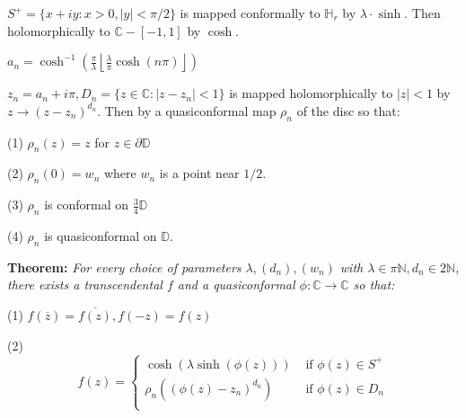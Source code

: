 \documentclass{beamer}
\begin{document}
\begin{frame} 

{\tiny $S^+ = \{ x + iy : x > 0, |y| < \pi/2 \}$ is mapped conformally to $\mathbb{H}_r$ by $\lambda\cdot\sinh$. Then holomorphically to $\mathbb{C} - [-1,1]$ by $\cosh$.

\vspace{1.25mm}

$a_n = \cosh^{-1}\left( \frac{\pi}{\lambda} \left \lfloor{ \frac{\lambda}{\pi} \cosh(n\pi) }\right \rfloor \right)$

\vspace{1.25mm}

$z_n = a_n + i\pi, D_n = \{ z \in \mathbb{C} : \left| z - z_n \right| < 1\} $ is mapped holomorphically to $|z|<1$ by $z\rightarrow (z - z_n)^{d_n}$. Then by a quasiconformal map $\rho_n$ of the disc so that: 

\hspace{5mm} (1) $\rho_n(z)=z$ for $z\in\partial\mathbb{D}$

\hspace{5mm} (2) $\rho_n(0)=w_n$ where $w_n$ is a point near $1/2$.

\hspace{5mm} (3) $\rho_n$ is conformal on $\frac{3}{4}\mathbb{D}$

\hspace{5mm} (4) $\rho_n$ is quasiconformal on $\mathbb{D}$.  

}

\vspace{5mm}

{\bf Theorem:}  {\it For every choice of parameters $\lambda, (d_n), (w_n)$ with $\lambda \in \pi\mathbb{N}, d_n \in 2\mathbb{N}$, there exists a transcendental $f$ and a quasiconformal $\phi: \mathbb{C}\rightarrow\mathbb{C}$ so that:}

\hspace{5mm} (1) $f(\overline{z}) = \overline{f(z)}, f(-z)=f(z)$

\hspace{5mm} (2) \[ f(z) = \begin{cases} 
      \cosh(\lambda\sinh(\phi(z))) & \textrm{ if } \phi(z)\in S^+ \\
      \rho_n((\phi(z)-z_n)^{d_n}) & \textrm{ if } \phi(z)\in D_n \\
   \end{cases} \]

\end{frame}
\end{document}
